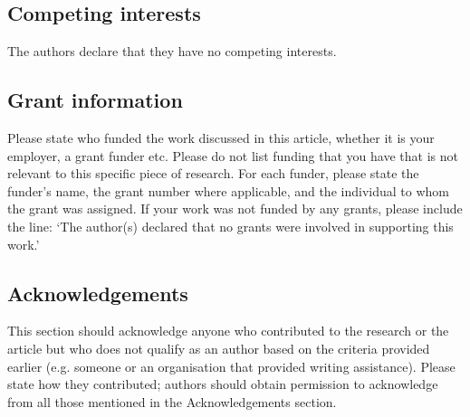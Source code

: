 \documentclass[twocolumn]{article}
\begin{document}
\subsection*{Competing interests}

The authors declare that they have no competing interests.


\subsection*{Grant information}
Please state who funded the work discussed in this article, whether it is your employer,
a grant funder etc. Please do not list funding that you have that is not relevant to this
specific piece of research. For each funder, please state the funder’s name, the grant
number where applicable, and the individual to whom the grant was assigned.
If your work was not funded by any grants, please include the line: ‘The author(s)
declared that no grants were involved in supporting this work.’

\subsection*{Acknowledgements}
This section should acknowledge anyone who contributed to the research or the
article but who does not qualify as an author based on the criteria provided earlier
(e.g. someone or an organisation that provided writing assistance). Please state how
they contributed; authors should obtain permission to acknowledge from all those
mentioned in the Acknowledgements section.
\end{document}
